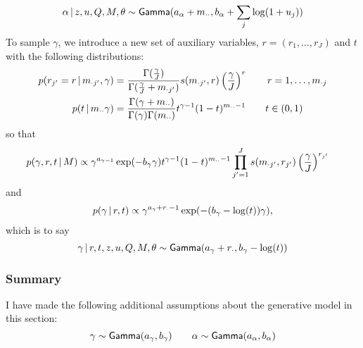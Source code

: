 \begin{equation}
  \label{eq:44} \alpha \, \vert \, z, u, Q, M, \theta \sim \mathsf{Gamma}(a_{\alpha}
+ m_{\cdot\cdot},b_\alpha + \sum_j\log(1+u_j))
\end{equation} To sample $\gamma$, we introduce a new set of auxiliary
variables, $r = (r_1, \dots, r_J)$ and $t$ with the following
distributions:
\begin{align}
  \label{eq:9} p(r_{j'} = r \, \vert \, m_{\cdot {j'}}, \gamma) &=
\frac{\Gamma(\frac{\gamma}{J})}{\Gamma(\frac{\gamma}{J} + m_{\cdot
{j'}})} s(m_{\cdot {j'}}, r) \left(\frac{\gamma}{J}\right)^r \qquad r
= 1, \dots, m_{\cdot j} \\ p(t \, \vert \, m_{\cdot\cdot} \gamma) &=
\frac{\Gamma(\gamma + m_{\cdot\cdot})}{\Gamma(\gamma)
\Gamma(m_{\cdot\cdot})} t^{\gamma - 1} (1-t)^{m_{\cdot\cdot} - 1}
\qquad t \in (0,1)
\end{align} so that
\begin{align}
  \label{eq:10} p(\gamma, r, t \, \vert \, M) &\propto \gamma^{a_{\gamma -
1}} \exp(-b_{\gamma}\gamma) t^{\gamma - 1}(1-t)^{m_{\cdot\cdot} - 1}
\prod_{j'=1}^J s(m_{\cdot {j'}}, r_{j'})
\left(\frac{\gamma}{J}\right)^{r_{j'}}
\end{align} and
\begin{align}
  \label{eq:11} p(\gamma \, \vert \, r, t) \propto \gamma^{a_\gamma +
r_{\cdot} - 1} \exp(-(b_{\gamma} - \log(t)) \gamma),
\end{align} which is to say
\begin{equation}
  \label{eq:18} \gamma \, \vert \, r, t, z, u, Q, M, \theta \sim
\mathsf{Gamma}(a_{\gamma} + r_{\cdot},b_{\gamma} - \log(t))
\end{equation}

\subsubsection{Summary}

I have made the following additional assumptions about the generative
model in this section:
\begin{equation}
  \label{eq:100} \gamma \sim \mathsf{Gamma}(a_{\gamma},b_{\gamma}) \qquad
\alpha \sim \mathsf{Gamma}(a_{\alpha},b_{\alpha})
\end{equation}

